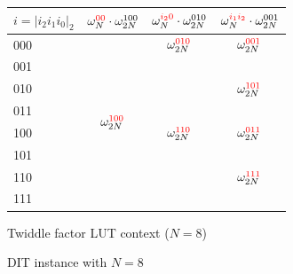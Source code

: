 \documentclass[submission]{iacrtrans}
\theoremstyle{plain}
\begin{document}
\begin{figure}[!tb]
\begin{subtable}[b]{0.8\textwidth}
  \centering
    \begin{tabular}{lccc}
     \hline
     $i=|i_2i_1i_0|_2$ & $\omega_N^{\textcolor{red}{00}}\cdot \omega_{2N}^{100}$ & $\omega_N^{\textcolor{red}{i_20}}\cdot \omega_{2N}^{010}$ & $\omega_N^{\textcolor{red}{i_1i_2}}\cdot \omega_{2N}^{001}$ \\
     \hline
     000 & \multirow{8}{*}{$\omega_{2N}^{\textcolor{red}{100}}$} & $\omega_{2N}^{\textcolor{red}{010}}$ & $\omega_{2N}^{\textcolor{red}{001}}$\\
     001 &                                      &                     &                     \\
     010 &                                      &                     & $\omega_{2N}^{\textcolor{red}{101}}$\\
     011 &                                      &                     &                     \\
     100 &                                      & $\omega_{2N}^{\textcolor{red}{110}}$ & $\omega_{2N}^{\textcolor{red}{011}}$\\
     101 &                                      &                     &                     \\
     110 &                                      &                     & $\omega_{2N}^{\textcolor{red}{111}}$\\
     111 &                                      &                     &                    \\
     \hline
     \end{tabular}
  \caption{Twiddle factor LUT context ($N=8$)}
  \label{table:table}
  \end{subtable}

\caption{DIT instance with $N=8$}
\end{figure}
\end{document}
